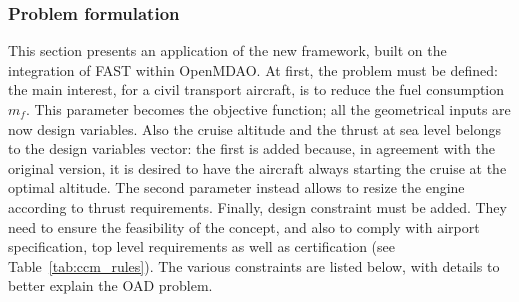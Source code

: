 \subsubsection{Problem formulation}
\label{subsubsec:chap2_a320_optim_prob_formulation}
This section presents an application of the new framework, built on the integration of FAST within OpenMDAO. 
At first, the problem must be defined: the main interest, for a civil transport aircraft, is to reduce the fuel consumption $m_f$.
This parameter becomes the objective function; all the geometrical inputs are now design variables. 
Also the cruise altitude and the thrust at sea level belongs to the design variables vector: the first is added because, in agreement with the original version, it is desired to have the aircraft always starting the cruise at the optimal altitude.
The second parameter instead allows to resize the engine according to thrust requirements. 
Finally, design constraint must be added. 
They need to ensure the feasibility of the concept, and also to comply with airport specification, top level requirements as well as certification (see Table~\ref{tab:ccm_rules}). 
The various constraints are listed below, with details to better explain the OAD problem. 
